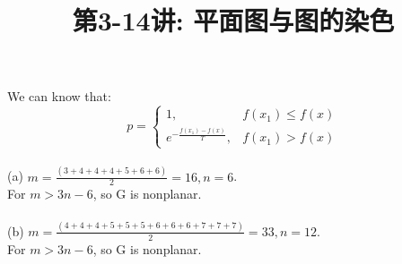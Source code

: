 \documentclass[a4paper, justified]{tufte-handout}
\title{第3-14讲: 平面图与图的染色}
\date{\zhtoday} %
\begin{document}
\maketitle
\noplagiarism %
\begin{abstract}
\end{abstract}
\beginrequired

\begin{problem}[CZ 9.3]
\end{problem}

\begin{solution}
  We can know that:
  \begin{equation}
    p=
    \left\{
    \begin{array}{ll}
      1,                          & f(x_1)\leq f(x) \\
      e^{-\frac{f(x_1)-f(x)}{T}}, & f(x_1)> f(x)
    \end{array}
    \right.
  \end{equation}
  \\
  (a)
  $m = \frac{(3+4+4+4+5+6+6)}{2} = 16, n = 6$.\\
  For $m> 3n - 6$, so G is nonplanar.\\
  \\
  (b)
  $m = \frac{(4+4+4+5+5+5+6+6+6+7+7+7)}{2} = 33, n = 12$.\\
  For $m> 3n - 6$, so G is nonplanar.
\end{solution}

\begin{problem}[CZ 9.5]
\end{problem}
\end{document}
